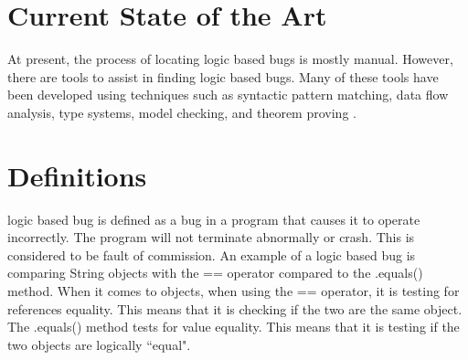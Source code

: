 
\section{Current State of the Art}\label{sec:stateofart}


At present, the process of locating logic based bugs is mostly manual. However, there are tools to assist in finding logic based bugs. Many of these tools have been developed using techniques such as syntactic pattern matching, data flow analysis, type systems, model checking, and theorem proving \cite{bugFindingTools}.


\section{Definitions}\label{sec:definitions}
 logic based bug is defined as a bug in a program that causes it to operate incorrectly. The program will not terminate abnormally or crash. This is considered to be fault of commission. An example of a logic based bug is comparing String objects with the == operator compared to the .equals() method. When it comes to objects, when using the == operator, it is testing for references equality. This means that it is checking if the two are the same object. The .equals() method tests for value equality. This means that it is testing if the two objects are logically ``equal". 
 
